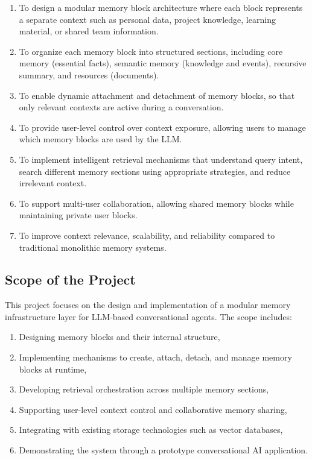 ﻿\documentclass[12pt,a4paper]{article}
\begin{document}
\begin{enumerate}
    \item To design a modular memory block architecture where each block represents a separate context such as personal data, project knowledge, learning material, or shared team information.
    
    \item To organize each memory block into structured sections, including core memory (essential facts), semantic memory (knowledge and events), recursive summary, and resources (documents).
    
    \item To enable dynamic attachment and detachment of memory blocks, so that only relevant contexts are active during a conversation.
    
    \item To provide user-level control over context exposure, allowing users to manage which memory blocks are used by the LLM.
    
    \item To implement intelligent retrieval mechanisms that understand query intent, search different memory sections using appropriate strategies, and reduce irrelevant context.
    
    \item To support multi-user collaboration, allowing shared memory blocks while maintaining private user blocks.
    
    \item To improve context relevance, scalability, and reliability compared to traditional monolithic memory systems.
\end{enumerate}

\subsection{Scope of the Project}

This project focuses on the design and implementation of a modular memory infrastructure layer for LLM-based conversational agents. The scope includes:

\begin{enumerate}
    \item Designing memory blocks and their internal structure,
    
    \item Implementing mechanisms to create, attach, detach, and manage memory blocks at runtime,
    
    \item Developing retrieval orchestration across multiple memory sections,
    
    \item Supporting user-level context control and collaborative memory sharing,
    
    \item Integrating with existing storage technologies such as vector databases,
    
    \item Demonstrating the system through a prototype conversational AI application.
\end{enumerate}
\end{document}
